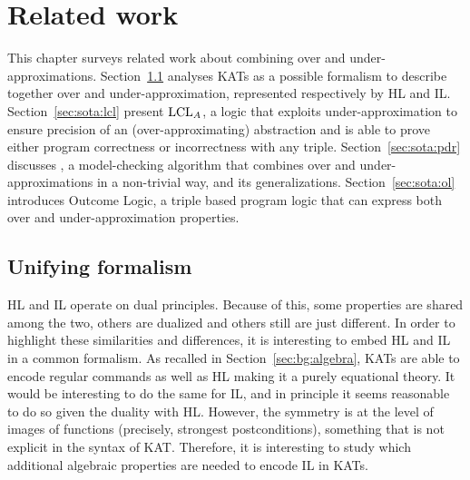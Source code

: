
\chapter{Related work}\label{ch:sota}
This chapter surveys related work about combining over and under-approximations.
Section~\ref{sec:sota:kat} analyses KATs as a possible formalism to describe together over and under-approximation, represented respectively by HL and IL.
Section~\ref{sec:sota:lcl} present $\text{LCL}_A$, a logic that exploits under-approximation to ensure precision of an (over-approximating) abstraction and is able to prove either program correctness or incorrectness with any triple.
Section~\ref{sec:sota:pdr} discusses , a model-checking algorithm that combines over and under-approximations in a non-trivial way, and its generalizations.
Section~\ref{sec:sota:ol} introduces Outcome Logic, a triple based program logic that can express both over and under-approximation properties.

\section{Unifying formalism}\label{sec:sota:kat}
HL and IL operate on dual principles. Because of this, some properties are shared among the two, others are dualized and others still are just different. In order to highlight these similarities and differences, it is interesting to embed HL and IL in a common formalism. As recalled in Section~\ref{sec:bg:algebra}, KATs are able to encode regular commands \cite{Kozen97} as well as HL \cite{Kozen00} making it a purely equational theory.
It would be interesting to do the same for IL, and in principle it seems reasonable to do so given the duality with HL. However, the symmetry is at the level of images of functions (precisely, strongest postconditions), something that is not explicit in the syntax of KAT. Therefore, it is interesting to study which additional algebraic properties are needed to encode IL in KATs.

